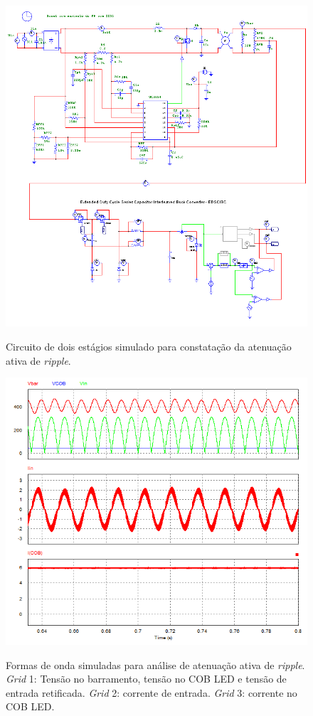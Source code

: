 \documentclass[
        12pt,
        openany, %
        oneside, %
        a4paper,			
        english,			
        brazil
        ]{abntbibufjf}
\begin{document}
\begin{figure}[!h]
	\centering
	\caption{Circuito de dois estágios simulado para constatação da atenuação ativa de \textit{ripple}.}
	\includegraphics[scale=.55]{../ESQUEMAS/PFC_AND_PC}\\
	\label{cici}
\end{figure}

\begin{figure}[!h]
	\centering
	\caption{Formas de onda simuladas para análise de atenuação ativa de \textit{ripple}. \textit{Grid} 1: Tensão no barramento, tensão no COB LED e tensão de entrada retificada. \textit{Grid} 2: corrente de entrada. \textit{Grid} 3: corrente no COB LED.}
	\includegraphics[scale=.65]{../GRAFICOS/ond}\\
	\label{ond}
\end{figure}
\end{document}
